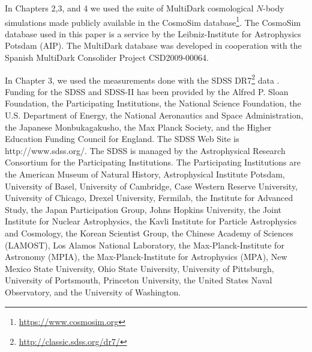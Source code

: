 


In Chapters 2,3, and 4 we used the suite of MultiDark cosmological $N$-body simulations made publicly available in the CosmoSim database\footnote{\url{https://www.cosmosim.org}}. The CosmoSim database used in this paper is a service by the Leibniz-Institute for Astrophysics Potsdam (AIP). The MultiDark database was developed in cooperation with the Spanish MultiDark Consolider Project CSD2009-00064.

In Chapter 3, we used the measurements done with the SDSS DR7\footnote{\url{http://classic.sdss.org/dr7/}} data \citep{abazajian2009}. 
Funding for the SDSS and SDSS-II has been provided by the Alfred P. Sloan Foundation, the Participating Institutions, the National Science Foundation, the U.S. Department of Energy, the National Aeronautics and Space Administration, the Japanese Monbukagakusho, the Max Planck Society, and the Higher Education Funding Council for England. The SDSS Web Site is http://www.sdss.org/. The SDSS is managed by the Astrophysical Research Consortium for the Participating Institutions. The Participating Institutions are the American Museum of Natural History, Astrophysical Institute Potsdam, University of Basel, University of Cambridge, Case Western Reserve University, University of Chicago, Drexel University, Fermilab, the Institute for Advanced Study, the Japan Participation Group, Johns Hopkins University, the Joint Institute for Nuclear Astrophysics, the Kavli Institute for Particle Astrophysics and Cosmology, the Korean Scientist Group, the Chinese Academy of Sciences (LAMOST), Los Alamos National Laboratory, the Max-Planck-Institute for Astronomy (MPIA), the Max-Planck-Institute for Astrophysics (MPA), New Mexico State University, Ohio State University, University of Pittsburgh, University of Portsmouth, Princeton University, the United States Naval Observatory, and the University of Washington.

